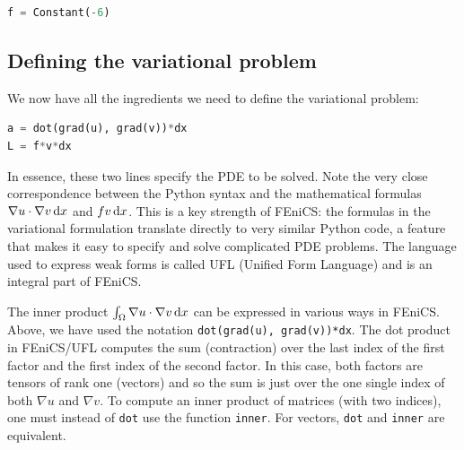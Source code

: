 \documentclass[graybox,envcountchap,sectrefs,final]{svmonodo}
\newenvironment{notice_mdfboxadmon}[1][]{
\begin{notice_mdfboxmdframed}[frametitle=#1]
}
{
\end{notice_mdfboxmdframed}
}
\begin{document}
\begin{lstlisting}[language=Python,style=graycolor]
f = Constant(-6)
\end{lstlisting}

\subsection{Defining the variational problem}

We now have all the ingredients we need to define the
variational problem:

\begin{lstlisting}[language=Python,style=graycolor]
a = dot(grad(u), grad(v))*dx
L = f*v*dx
\end{lstlisting}
In essence, these two lines specify the PDE to be solved.  Note the
very close correspondence between the Python syntax and the
mathematical formulas $\nabla u\cdot\nabla v \dx$ and $fv \dx$.  This
is a key strength of FEniCS: the formulas in the variational
formulation translate directly to very similar Python code, a feature
that makes it easy to specify and solve complicated PDE problems. The
language used to express weak forms is called UFL (Unified Form
Language) \cite{UFL_2014,FEniCS} and is an integral part of FEniCS.

\begin{notice_mdfboxadmon}
The inner product $\int_{\Omega} \nabla u \cdot \nabla v \dx$
can be expressed in various ways in FEniCS. Above, we have used
the notation \texttt{dot(grad(u), grad(v))*dx}. The dot product in
FEniCS/UFL computes the sum (contraction) over the last index
of the first factor and the first index of the second factor.
In this case, both factors are tensors of rank one (vectors) and
so the sum is just over the one single index of both $\nabla u$
and $\nabla v$. To compute an inner product of matrices (with
two indices), one must instead of \texttt{dot} use the function \texttt{inner}.
For vectors, \texttt{dot} and \texttt{inner} are equivalent.
\end{notice_mdfboxadmon} %

\end{document}
